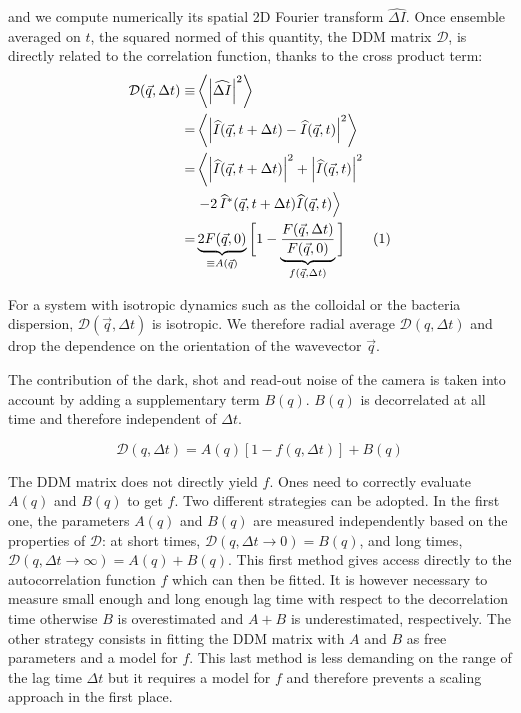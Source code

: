 \documentclass[prb,reprint,amsmath,amssymb]{revtex4-1}
\newcommand{\tg}[1]{{\color{magenta}#1}} %
\begin{document}
and we compute numerically its spatial 2D Fourier transform $\widehat{\Delta I}$. Once ensemble averaged on $t$, the squared normed of this quantity, the DDM matrix $\mathcal{D}$, is directly related to the correlation function, thanks to the cross product term:
\begin{align*}
\mathcal{D}(\vec{q},\Delta t) \equiv& \left\langle \left|\widehat{\Delta I}\right|^2 \right\rangle\\
 =& \left\langle \left|\widehat{I}(\vec{q},t+\Delta t) - \widehat{I}(\vec{q},t)\right|^2 \right\rangle \\
=& \left\langle \left|\widehat{I}(\vec{q},t+ \Delta t)\right|^2 + \left|\widehat{I}(\vec{q},t)\right|^2\right. \\
&\left.- 2 \, \widehat{I}^*(\vec{q},t+\Delta t) \widehat{I}(\vec{q},t) \right\rangle\\
=& \underbrace{2F(\vec{q}, 0)}_{\equiv A(\vec{q})} \bigg[ 1-\underbrace{\frac{F(\vec{q}, \Delta t)}{F(\vec{q}, 0)}}_{f(\vec{q}, \Delta t)} \bigg] \addtocounter{equation}{1}\tag{\theequation} \label{eq:DDM}
\end{align*}


\tg{For a system with isotropic dynamics such as the colloidal or the bacteria dispersion,  $\mathcal{D}(\vec{q},\Delta t)$  is isotropic. We therefore radial average $\mathcal{D}(q,\Delta t)$ and drop the dependence on the orientation of the wavevector $\vec{q}$.}

The contribution of the \tg{dark, shot and read-out noise\cite{Mignard2015,Joubert2011}} of the camera is taken into account by adding a supplementary term $B(q)$. $B(q)$ is decorrelated  at all time and therefore independent of $\Delta t$.

\begin{equation}
\mathcal{D}(q,\Delta t) = A(q)\left[1-f(q, \Delta t)\right] + B(q)
\label{eq:D2f}
\end{equation}

\tg{The DDM matrix does not directly yield $f$. Ones need to correctly evaluate $A(q)$ and $B(q)$ to get $f$. Two different strategies can be adopted. In the first one, the parameters $A(q)$ and $B(q)$ are measured independently based on the properties of $\mathcal{D}$: at short times, $\mathcal{D}(q,\Delta t\rightarrow 0) = B(q)$, and long times, $\mathcal{D}(q,\Delta t\rightarrow \infty) = A(q)+B(q)$. This first method gives access directly to the autocorrelation function $f$ which can then be fitted. It is however necessary to measure small enough and  long enough lag time with respect to the decorrelation time otherwise $B$ is overestimated and $A+B$ is underestimated, respectively. The other strategy consists in fitting the DDM matrix with $A$ and $B$ as free parameters and a model for $f$. This last method is less demanding on the range of the lag time $\Delta t$ but it requires a model for $f$ and therefore prevents a scaling approach in the first place.}
\end{document}
